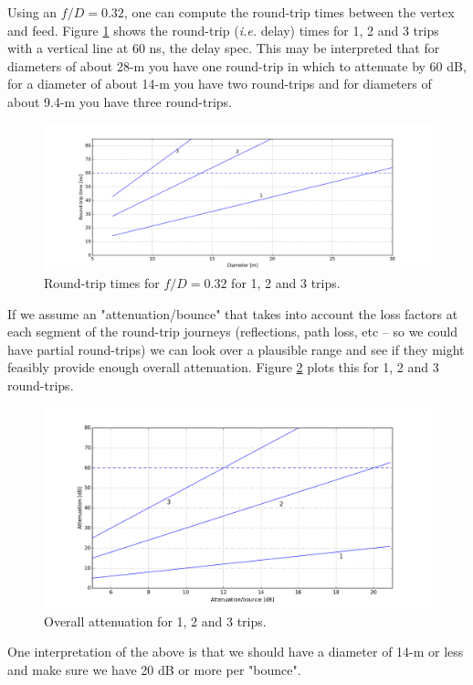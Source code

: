 \documentclass[11pt]{article}
\begin{document}
Using an $f/D=0.32$, one can compute the round-trip times between the vertex and feed.  Figure \ref{fig:roundtrip} shows the round-trip ({\em i.e.} delay) times for 1, 2 and 3 trips with a vertical line at 60 ns, the delay spec.  This may be interpreted that for diameters of about 28-m you have one round-trip in which to attenuate by 60 dB, for a diameter of about 14-m  you have two round-trips and for diameters of about 9.4-m you have three round-trips. 
\begin{figure}[h]
\centering
\includegraphics[width=1.0\textwidth]{roundtrip.png}
\caption{Round-trip times for $f/D=0.32$ for 1, 2 and 3 trips.}
\label{fig:roundtrip}
\end{figure}

If we assume an "attenuation/bounce" that takes into account the loss factors at each segment of the round-trip journeys (reflections, path loss, etc -- so we could have partial round-trips) we can look over a plausible range and see if they might feasibly provide enough overall attenuation.  Figure \ref{fig:bounces} plots this for 1, 2 and 3 round-trips.
\begin{figure}[h]
\centering
\includegraphics[width=1.0\textwidth]{bounces.png}
\caption{Overall attenuation for 1, 2 and 3 trips.}
\label{fig:bounces}
\end{figure}

One interpretation of the above is that we should have a diameter of 14-m or less and make sure we have 20 dB or more per "bounce".  
\end{document}
